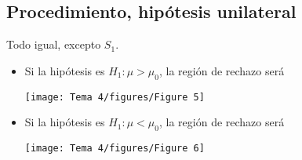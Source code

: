 \subsection{Procedimiento, hipótesis unilateral}
Todo igual, excepto $S_1$.
\begin{itemize}[label=\textbullet]
    \item Si la hipótesis es $H_1:\mu>\mu_0$, la región de rechazo será
        \begin{center}
            \texttt{[image: Tema 4/figures/Figure 5]}
        \end{center}
    \item Si la hipótesis es $H_1:\mu<\mu_0$, la región de rechazo será
        \begin{center}
            \texttt{[image: Tema 4/figures/Figure 6]}
        \end{center}
\end{itemize}
